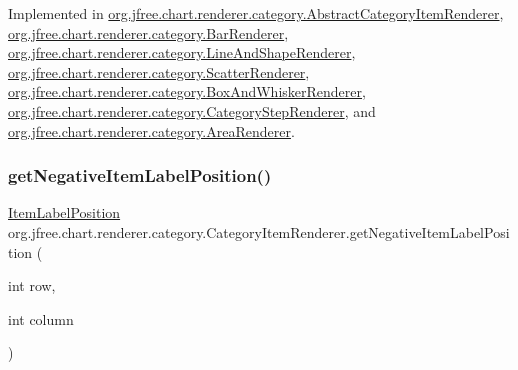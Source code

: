 Implemented in \mbox{\hyperlink{classorg_1_1jfree_1_1chart_1_1renderer_1_1category_1_1_abstract_category_item_renderer_a7a86e8d71b7d79ed228580497ac39dca}{org.\+jfree.\+chart.\+renderer.\+category.\+Abstract\+Category\+Item\+Renderer}}, \mbox{\hyperlink{classorg_1_1jfree_1_1chart_1_1renderer_1_1category_1_1_bar_renderer_a30254dc9cccaf5d15872a760965f7a9d}{org.\+jfree.\+chart.\+renderer.\+category.\+Bar\+Renderer}}, \mbox{\hyperlink{classorg_1_1jfree_1_1chart_1_1renderer_1_1category_1_1_line_and_shape_renderer_ac095c9d61c12633c01dceb69131d655e}{org.\+jfree.\+chart.\+renderer.\+category.\+Line\+And\+Shape\+Renderer}}, \mbox{\hyperlink{classorg_1_1jfree_1_1chart_1_1renderer_1_1category_1_1_scatter_renderer_a5a81b3c8d6be05405e982aab9d5cbd2d}{org.\+jfree.\+chart.\+renderer.\+category.\+Scatter\+Renderer}}, \mbox{\hyperlink{classorg_1_1jfree_1_1chart_1_1renderer_1_1category_1_1_box_and_whisker_renderer_a4bcc61984760a07622e11a734aa835e3}{org.\+jfree.\+chart.\+renderer.\+category.\+Box\+And\+Whisker\+Renderer}}, \mbox{\hyperlink{classorg_1_1jfree_1_1chart_1_1renderer_1_1category_1_1_category_step_renderer_ae7db1212606a6f3db9eee52486a6623f}{org.\+jfree.\+chart.\+renderer.\+category.\+Category\+Step\+Renderer}}, and \mbox{\hyperlink{classorg_1_1jfree_1_1chart_1_1renderer_1_1category_1_1_area_renderer_ac0e7bac40efae55815f961d1074b6873}{org.\+jfree.\+chart.\+renderer.\+category.\+Area\+Renderer}}.

\mbox{\label{interfaceorg_1_1jfree_1_1chart_1_1renderer_1_1category_1_1_category_item_renderer_aa633168ae04a5ff47ae98ecd7cf1f497}} 
\subsubsection{\texorpdfstring{get\+Negative\+Item\+Label\+Position()}{getNegativeItemLabelPosition()}\hspace{0.1cm}{\footnotesize\ttfamily [1/2]}}
{\footnotesize\ttfamily \mbox{\hyperlink{classorg_1_1jfree_1_1chart_1_1labels_1_1_item_label_position}{Item\+Label\+Position}} org.\+jfree.\+chart.\+renderer.\+category.\+Category\+Item\+Renderer.\+get\+Negative\+Item\+Label\+Position (\begin{DoxyParamCaption}\item[{int}]{row,  }\item[{int}]{column }\end{DoxyParamCaption})}

